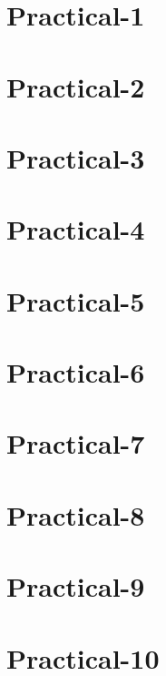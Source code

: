 \documentclass[12pt]{report}
\begin{document}




\footskip 0.7cm
\thispagestyle{empty} 
\pagetitle
\newpage
{}
\cfoot{\thepage}




\cfoot{\thepage}

\newpage

\chapter{Practical-1}




\chapter{Practical-2}

\chapter{Practical-3}

\chapter{Practical-4}

\chapter{Practical-5}

%
\chapter{Practical-6}

\chapter{Practical-7}

\chapter{Practical-8}

\chapter{Practical-9}


\chapter{Practical-10}

\end{document}

